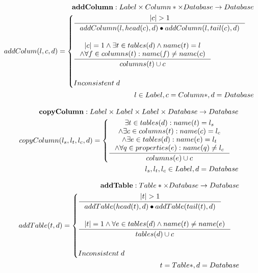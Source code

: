 \documentclass[11pt]{article}
\begin{document}
\begin{align*}
	\mathbf{addColumn} : Label \times Column* \times Database \rightarrow Database \\ 	
	addColum(l, c, d) = \begin{cases}
		\inference{|c| > 1}{addColumn(l, head(c), d) \bullet addColumn(l, tail(c), d)} \\ \\
		\inference{|c| = 1 \wedge \exists t \in tables(d) \wedge name(t) = l \\ \wedge \forall f \in columns(t) : name(f) \neq name(c)}{columns(t) \cup c}\\ \\
		Inconsistent \;d 
	 \end{cases}\\ 
	 l \in Label, c = Column*, d = Database
\end{align*}

\begin{align*}
	\mathbf{copyColumn} : Label \times Label \times Label \times Database \rightarrow Database \\
	copyColumn(l_s, l_t, l_c, d) = \begin{cases}
 		\inference{\exists t \in tables(d) : name(t) = l_s \\ \wedge \exists c \in columns(t) : name(c) = l_c \\ \wedge \exists e \in tables(d) : name(e) = l_t  \\ \wedge \forall q \in properties(e) : name(q) \neq l_c}{columns(e) \cup c }
	\end{cases} \\
	l_s,l_t,l_c \in Label, d = Database
\end{align*}

\begin{align*}
	\mathbf{addTable} : Table* \times Database \rightarrow Database \\ 
	addTable(t, d) = \begin{cases}
		\inference{|t| > 1}{addTable(head(t),d) \bullet addTable(tail(t), d)}
\\ \\	
		\inference{|t| = 1 \wedge \forall e \in tables(d) \wedge name(t) \neq name(e)}{tables(d) \cup c}
\\ \\
		Inconsistent \;d 
	 \end{cases}\\ 
	t = Table*,  d = Database
\end{align*}
\end{document}
